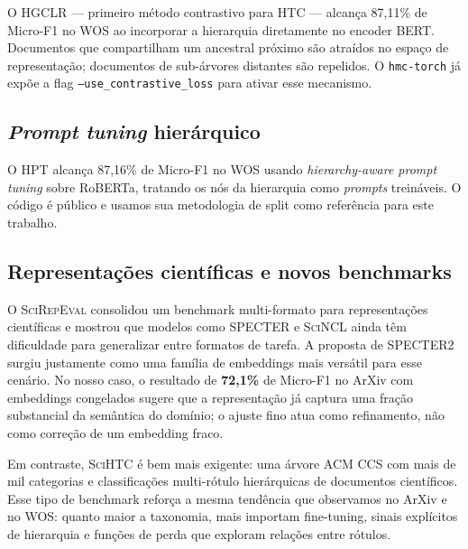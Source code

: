 \documentclass[11pt,a4paper,twoside]{article}
\begin{document}
O \textsc{HGCLR} \cite{wang2022hgclr} --- primeiro método contrastivo para HTC ---
alcança 87,11\% de Micro-F1 no WOS ao incorporar a hierarquia diretamente no encoder
BERT. Documentos que compartilham um ancestral próximo são atraídos no espaço de
representação; documentos de sub-árvores distantes são repelidos. O \texttt{hmc-torch}
já expõe a flag \texttt{--use\_contrastive\_loss} para ativar esse mecanismo.

\subsection{\textit{Prompt tuning} hierárquico}

O \textsc{HPT} \cite{wang2022hpt} alcança 87,16\% de Micro-F1 no WOS usando
\textit{hierarchy-aware prompt tuning} sobre RoBERTa, tratando os nós da hierarquia
como \textit{prompts} treináveis. O código é público e usamos sua metodologia de split
como referência para este trabalho.

\subsection{Representações científicas e novos benchmarks}

O \textsc{SciRepEval} \cite{singh2022scirepeval} consolidou um benchmark
multi-formato para representações científicas e mostrou que modelos como
\textsc{SPECTER} e \textsc{SciNCL} ainda têm dificuldade para generalizar entre
formatos de tarefa. A proposta de \textsc{SPECTER2} surgiu justamente como uma
família de embeddings mais versátil para esse cenário. No nosso caso, o
resultado de \textbf{72,1\%} de Micro-F1 no ArXiv com embeddings congelados
sugere que a representação já captura uma fração substancial da semântica do
domínio; o ajuste fino atua como refinamento, não como correção de um embedding
fraco.

Em contraste, \textsc{SciHTC} \cite{sadat2022scitc} é bem mais exigente: uma
árvore ACM CCS com mais de mil categorias e classificações multi-rótulo
hierárquicas de documentos científicos. Esse tipo de benchmark reforça a mesma
tendência que observamos no ArXiv e no WOS: quanto maior a taxonomia, mais
importam fine-tuning, sinais explícitos de hierarquia e funções de perda que
exploram relações entre rótulos.
\end{document}
